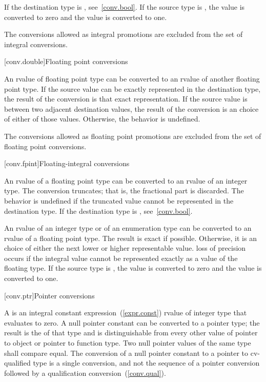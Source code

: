 \pnum
{}%
If the destination type is , see~\ref{conv.bool}. If the
source type is , the value  is converted to
zero and the value  is converted to one.

\pnum
The conversions allowed as integral promotions are excluded from the set
of integral conversions.

[conv.double]{Floating point conversions}

\pnum
{}%
An rvalue of floating point type can be converted to an rvalue of
another floating point type. If the source value can be exactly
represented in the destination type, the result of the conversion is
that exact representation. If the source value is between two adjacent
destination values, the result of the conversion is an
 choice of either of those values.
Otherwise, the behavior is undefined.

\pnum
The conversions allowed as floating point promotions are excluded from
the set of floating point conversions.

[conv.fpint]{Floating-integral conversions}

\pnum
{}%
An rvalue of a floating point type can be converted to an rvalue of an
integer type. The conversion truncates; that is, the fractional part is
discarded.
%
The behavior is undefined if the truncated value cannot be represented
in the destination type.
\enternote 
If the destination type is , see~\ref{conv.bool}.
\exitnote 

\pnum
{}%
%
%
An rvalue of an integer type or of an enumeration type can be converted to
an rvalue of a floating point type. The result is exact if possible.
Otherwise, it is an  choice of either the next lower or higher representable
value. \enternote loss of precision occurs if the integral value cannot be represented
exactly as a value of the floating type. \exitnote If the
source type is , the value  is converted to zero and the value
 is converted to one.

[conv.ptr]{Pointer conversions}

\pnum
{}%
%
%
%
A  is an integral constant
expression~(\ref{expr.const}) rvalue of integer type that evaluates to zero.
A null pointer constant can be converted to a pointer type; the
result is the  of that type and is
distinguishable from every other value of
pointer to object or pointer to function type.
Two null pointer values of the same type shall compare
equal. The conversion of a null pointer constant to a pointer to
cv-qualified type is a single conversion, and not the sequence of a
pointer conversion followed by a qualification
conversion~(\ref{conv.qual}).

